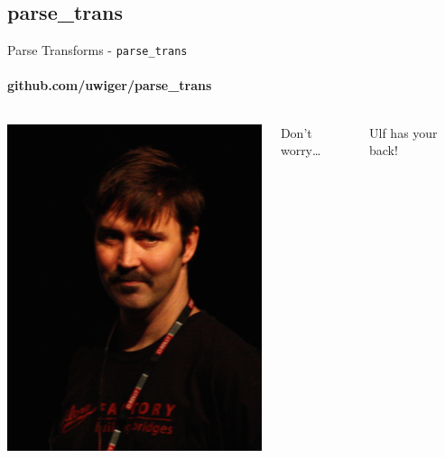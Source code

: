 \documentclass[c]{beamer}
\begin{document}
\subsection{parse\_trans}

\begin{frame}[c]{Parse Transforms - \texttt{parse\_trans}}
  \framesubtitle{github.com/uwiger/parse\_trans}
  \begin{columns}[c]
    \includegraphics[width=\textwidth]{ulf_wiger.png}

    Don't worry\ldots
    \par {\Large Ulf has your back!}
  \end{columns}
\end{frame}
\end{document}

